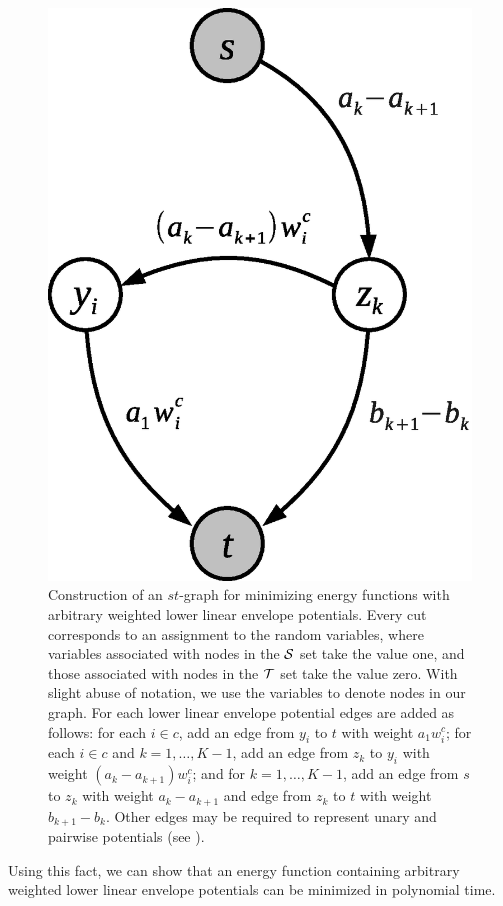 \documentclass[10pt,journal,letterpaper,compsoc]{IEEEtran}
\renewcommand{\cite}{\citep}
\begin{document}
\begin{figure}[t]
  \centering
  \includegraphics[width=0.55\columnwidth]{figures/stmincut}
  \vspace{2mm}
  \caption{\label{fig:stmincut} Construction of an $st$-graph for
    minimizing energy functions with arbitrary weighted lower linear
    envelope potentials. Every cut corresponds to an assignment to the
    random variables, where variables associated with nodes in the
    ${\cal S}$ set take the value one, and those associated with nodes
    in the $\T$ set take the value zero. With slight abuse of
    notation, we use the variables to denote nodes in our graph. For
    each lower linear envelope potential edges are added as follows:
    for each $i \in c$, add an edge from $y_i$ to $t$ with weight $a_1
    w^c_i$; for each $i \in c$ and $k = 1, \ldots, K-1$, add an edge
    from $z_k$ to $y_i$ with weight $(a_{k} - a_{k+1}) w^c_i$; and for
    $k = 1, \ldots, K-1$, add an edge from $s$ to $z_k$ with weight
    $a_k - a_{k+1}$ and edge from $z_k$ to $t$ with weight $b_{k+1} -
    b_k$.
    Other edges may be required to represent unary and pairwise
    potentials (see \cite{Kolmogorov:PAMI04}).
  }
\end{figure}

Using this fact, we can show that an energy function containing
arbitrary weighted lower linear envelope potentials can be minimized
in polynomial time.
\end{document}
